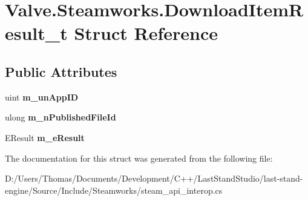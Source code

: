 \hypertarget{structValve_1_1Steamworks_1_1DownloadItemResult__t}{}\section{Valve.\+Steamworks.\+Download\+Item\+Result\+\_\+t Struct Reference}
\label{structValve_1_1Steamworks_1_1DownloadItemResult__t}
\subsection*{Public Attributes}
\begin{DoxyCompactItemize}
\item 
\hypertarget{structValve_1_1Steamworks_1_1DownloadItemResult__t_ac7566f5a9605cc3a0d8baef137503602}{}uint {\bfseries m\+\_\+un\+App\+I\+D}\label{structValve_1_1Steamworks_1_1DownloadItemResult__t_ac7566f5a9605cc3a0d8baef137503602}

\item 
\hypertarget{structValve_1_1Steamworks_1_1DownloadItemResult__t_a5073dd72ff814bf083ef1c1c3e861e20}{}ulong {\bfseries m\+\_\+n\+Published\+File\+Id}\label{structValve_1_1Steamworks_1_1DownloadItemResult__t_a5073dd72ff814bf083ef1c1c3e861e20}

\item 
\hypertarget{structValve_1_1Steamworks_1_1DownloadItemResult__t_ae2cd9079cf50432931d72c4744650a74}{}E\+Result {\bfseries m\+\_\+e\+Result}\label{structValve_1_1Steamworks_1_1DownloadItemResult__t_ae2cd9079cf50432931d72c4744650a74}

\end{DoxyCompactItemize}


The documentation for this struct was generated from the following file\+:\begin{DoxyCompactItemize}
\item 
D\+:/\+Users/\+Thomas/\+Documents/\+Development/\+C++/\+Last\+Stand\+Studio/last-\/stand-\/engine/\+Source/\+Include/\+Steamworks/steam\+\_\+api\+\_\+interop.\+cs\end{DoxyCompactItemize}
